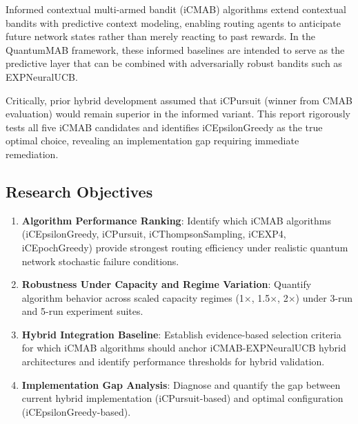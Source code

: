 \documentclass[12pt,a4paper]{article}
\begin{document}
Informed contextual multi-armed bandit (iCMAB) algorithms extend contextual bandits with predictive context modeling, enabling routing agents to anticipate future network states rather than merely reacting to past rewards. In the QuantumMAB framework, these informed baselines are intended to serve as the predictive layer that can be combined with adversarially robust bandits such as EXPNeuralUCB.

Critically, prior hybrid development assumed that iCPursuit (winner from CMAB evaluation) would remain superior in the informed variant. This report rigorously tests all five iCMAB candidates and identifies iCEpsilonGreedy as the true optimal choice, revealing an implementation gap requiring immediate remediation.

\subsection{Research Objectives}
\begin{enumerate}
\item \textbf{Algorithm Performance Ranking}: Identify which iCMAB algorithms (iCEpsilonGreedy, iCPursuit, iCThompsonSampling, iCEXP4, iCEpochGreedy) provide strongest routing efficiency under realistic quantum network stochastic failure conditions.
\item \textbf{Robustness Under Capacity and Regime Variation}: Quantify algorithm behavior across scaled capacity regimes (1$\times$, 1.5$\times$, 2$\times$) under 3-run and 5-run experiment suites.
\item \textbf{Hybrid Integration Baseline}: Establish evidence-based selection criteria for which iCMAB algorithms should anchor iCMAB-EXPNeuralUCB hybrid architectures and identify performance thresholds for hybrid validation.
\item \textbf{Implementation Gap Analysis}: Diagnose and quantify the gap between current hybrid implementation (iCPursuit-based) and optimal configuration (iCEpsilonGreedy-based).
\end{enumerate}
\end{document}
